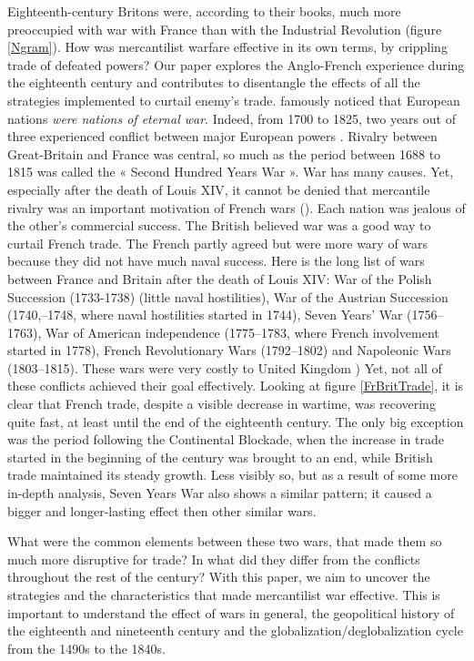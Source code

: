 \documentclass[12pt,a4paper,notitlepage,english]{article}
\begin{document}
Eighteenth-century Britons were, according to their books, much more preoccupied with war with France than with the Industrial Revolution (figure \ref{Ngram}).
How was mercantilist warfare \citep{Conti2017} effective in its own terms, by crippling trade of defeated powers? Our paper explores the Anglo-French experience during the eighteenth century and contributes to disentangle the effects of all the  
strategies implemented to curtail enemy's trade.
\cite{Jefferson1823} famously noticed that European nations \textit{were nations of eternal war}. Indeed, from 1700 to 1825, two years out of three experienced conflict between major European powers \citep{Roser2016}. Rivalry between Great-Britain and France was central, so much as the period between 1688 to 1815 was called the « Second Hundred Years War ». War has many causes. Yet, especially after the death of Louis XIV, it cannot be denied that mercantile rivalry was an important motivation of French wars (\cite{Wallerstein1980, Tracy1991 Brewer2002,Davis2006, Crouzet2008}). Each nation was jealous of the other's commercial success. The British believed war was a good way to curtail French trade. The French partly agreed but were more wary of wars because they did not have much naval success.
Here is the long list of wars between France and Britain after the death of Louis XIV: War of the Polish Succession (1733-1738) (little naval hostilities), War of the Austrian Succession (1740,–1748, where naval hostilities started in 1744), Seven Years' War (1756–1763), War of American independence (1775–1783, where French involvement started in 1778), French Revolutionary Wars (1792–1802) and Napoleonic Wars (1803–1815).
These wars were very costly to United Kingdom \cite{Baugh1965,Neal1977,Brewer2002})
Yet, not all of these conflicts achieved their goal effectively.
Looking at figure \ref{FrBritTrade}, it is clear that French trade, despite a visible decrease in wartime, was recovering quite fast, at least until the end of the eighteenth century.
The only big exception was the period following the Continental Blockade, when the increase in trade started in the beginning of the century was brought to an end, while British trade maintained its steady growth.
Less visibly so, but as a result of some more in-depth analysis, Seven Years War also shows a similar pattern; it caused a bigger and longer-lasting effect then other similar wars.

What were the common elements between these two wars, that made them so much more disruptive for trade? In what did they differ from the conflicts throughout the rest of the century? With this paper, we aim to uncover the strategies and the characteristics that made mercantilist war effective.
This is important to understand the effect of wars in general, the geopolitical history of the eighteenth and nineteenth century and the globalization/deglobalization cycle from the 1490s to the 1840s.
\end{document}
